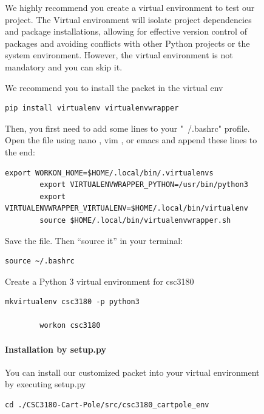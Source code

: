 \documentclass[10pt,a4paper]{article}
\begin{document}
\begin{figure}[H]
	We highly recommend you create a virtual environment to test our project. The Virtual environment will isolate project dependencies and package installations, allowing for effective version control of packages and avoiding conflicts with other Python projects or the system environment. However, the virtual environment is not mandatory and you can skip it.
	
	We recommend you to install the packet in the virtual env
	
	\begin{lstlisting}[caption={Installation of virtualenv}]
		pip install virtualenv virtualenvwrapper
	\end{lstlisting}
	
	Then, you first need to add some lines to your "~/.bashrc" profile. Open the file using nano , vim , or emacs and append these lines to the end:
	
	\begin{lstlisting}[caption={Setup of Environment Path}]
		export WORKON_HOME=$HOME/.local/bin/.virtualenvs
		export VIRTUALENVWRAPPER_PYTHON=/usr/bin/python3
		export VIRTUALENVWRAPPER_VIRTUALENV=$HOME/.local/bin/virtualenv
		source $HOME/.local/bin/virtualenvwrapper.sh
	\end{lstlisting}
	
	Save the file. Then “source it” in your terminal:
	
	\begin{lstlisting}[caption={Setup of Environment Path}]
		source ~/.bashrc
	\end{lstlisting}
	
	Create a Python 3 virtual environment for csc3180
	
	\begin{lstlisting}[caption={Create a Virtual-Env}]
		mkvirtualenv csc3180 -p python3
		
		workon csc3180
	\end{lstlisting}
	
	
	\paragraph{Installation by setup.py}
	
	You can install our customized packet into your virtual environment by executing setup.py
	
	\begin{lstlisting}[caption={To use setup.py to install our env packet}]
		cd ./CSC3180-Cart-Pole/src/csc3180_cartpole_env
		

\end{lstlisting}
\end{figure}
\end{document}
